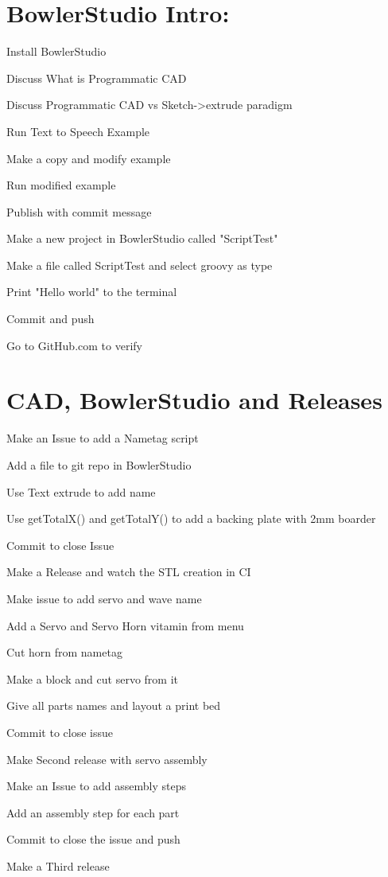 \documentclass{article}
\begin{document}
\section{BowlerStudio Intro:}
\begin{todolist}
	\item Install BowlerStudio
	\item Discuss What is Programmatic CAD
	\item Discuss Programmatic CAD vs Sketch->extrude paradigm
	\item Run Text to Speech Example
	\item Make a copy and modify example
	\item Run modified example
	\item Publish with commit message
	\item Make a new project in BowlerStudio called "ScriptTest"
	\item Make a file called ScriptTest and select groovy as type
	\item Print "Hello world" to the terminal
	\item Commit and push
	\item Go to GitHub.com to verify
\end{todolist}

\newpage

\section{CAD, BowlerStudio and Releases}
\begin{todolist}
	\item Make an Issue to add a Nametag script
	\item Add a file to git repo in BowlerStudio
	\item Use Text extrude to add name
	\item Use getTotalX() and getTotalY() to add a backing plate with 2mm boarder
	\item Commit to close Issue
	\item Make a Release and watch the STL creation in CI
	\item Make issue to add servo and wave name
	\item Add a Servo and Servo Horn vitamin from menu
	\item Cut horn from nametag
	\item Make a block and cut servo from it
	\item Give all parts names and layout a print bed
	\item Commit to close issue
	\item Make Second release with servo assembly
	\item Make an Issue to add assembly steps
	\item Add an assembly step for each part
	\item Commit to close the issue and push
	\item Make a Third release
\end{todolist}
\newpage
\end{document}
